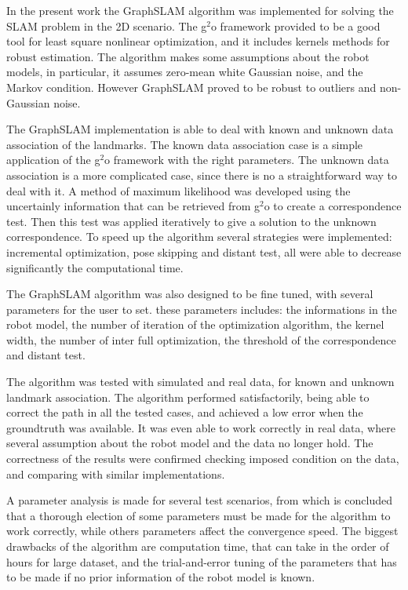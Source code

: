 \begin{conclusion}
\label{chap:conclusion}

In the present work the GraphSLAM algorithm was implemented for solving the SLAM problem in the 2D scenario. The g$^2$o framework provided to be a good tool for least square nonlinear optimization, and it includes kernels methods for robust estimation. The algorithm makes some assumptions about the robot models, in particular, it assumes zero-mean white Gaussian noise, and the Markov condition. However GraphSLAM proved to be robust to outliers and non-Gaussian noise.

The GraphSLAM implementation is able to deal with known and unknown data association of the landmarks. The known data association case is a simple application of the g$^2$o framework with the right parameters. The unknown data association is a more complicated case, since there is no a straightforward way to deal with it. A method of maximum likelihood was developed using the uncertainly information that can be retrieved from g$^2$o to create a correspondence test. Then this test was applied iteratively to give a solution to the unknown correspondence. To speed up the algorithm several strategies were implemented: incremental optimization, pose skipping and distant test, all were able to decrease significantly the computational time.

The GraphSLAM algorithm was also designed to be fine tuned, with several parameters for the user to set. these parameters includes: the informations in the robot model, the number of iteration of the optimization algorithm, the kernel width, the number of inter full optimization, the threshold of the correspondence and distant test. 

The algorithm was tested with simulated and real data, for known and unknown landmark association. The algorithm performed satisfactorily, being able to correct the path in all the tested cases, and achieved a low error when the groundtruth was available. It was even able to work correctly in real data, where several assumption about the robot model and the data no longer hold. The correctness of the results were confirmed checking imposed condition on the data, and comparing with similar implementations. 

A parameter analysis is made for several test scenarios, from which is concluded that a thorough election of some parameters must be made for the algorithm to work correctly, while others parameters affect the convergence speed. The biggest drawbacks of the algorithm are computation time, that can take in the order of hours for large dataset, and the trial-and-error tuning of the parameters that has to be made if no prior information of the robot model is known. 


\end{conclusion}
